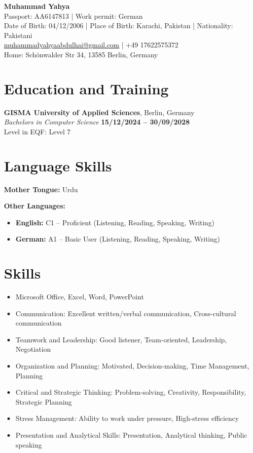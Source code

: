\documentclass[a4paper,10pt]{article}
\begin{document}
\begin{center}
    {\LARGE \textbf{Muhammad Yahya}}\\
    \vspace{0.2cm}
    Passport: AA6147813 \quad | \quad Work permit: German\\
    Date of Birth: 04/12/2006 \quad | \quad Place of Birth: Karachi, Pakistan \quad | \quad Nationality: Pakistani\\
    \vspace{0.2cm}
    \href{mailto:muhammadyahyaabdulhai@gmail.com}{muhammadyahyaabdulhai@gmail.com} \quad | \quad +49 17622575372\\
    Home: Schönwalder Str 34, 13585 Berlin, Germany
\end{center}

\vspace{0.4cm}
\section*{Education and Training}
\textbf{GISMA University of Applied Sciences}, Berlin, Germany\\
\textit{Bachelors in Computer Science} \hfill \textbf{15/12/2024 – 30/09/2028}\\
Level in EQF: Level 7



\vspace{0.4cm}
\section*{Language Skills}
\textbf{Mother Tongue:} Urdu

\textbf{Other Languages:}
\begin{itemize}[leftmargin=*]
    \item \textbf{English:} C1 – Proficient (Listening, Reading, Speaking, Writing)
    \item \textbf{German:} A1 – Basic User (Listening, Reading, Speaking, Writing)
\end{itemize}

\vspace{0.4cm}
\section*{Skills}
\begin{itemize}[leftmargin=*]
    \item Microsoft Office, Excel, Word, PowerPoint
    \item Communication: Excellent written/verbal communication, Cross-cultural communication
    \item Teamwork and Leadership: Good listener, Team-oriented, Leadership, Negotiation
    \item Organization and Planning: Motivated, Decision-making, Time Management, Planning
    \item Critical and Strategic Thinking: Problem-solving, Creativity, Responsibility, Strategic Planning
    \item Stress Management: Ability to work under pressure, High-stress efficiency
    \item Presentation and Analytical Skills: Presentation, Analytical thinking, Public speaking
\end{itemize}
\end{document}

